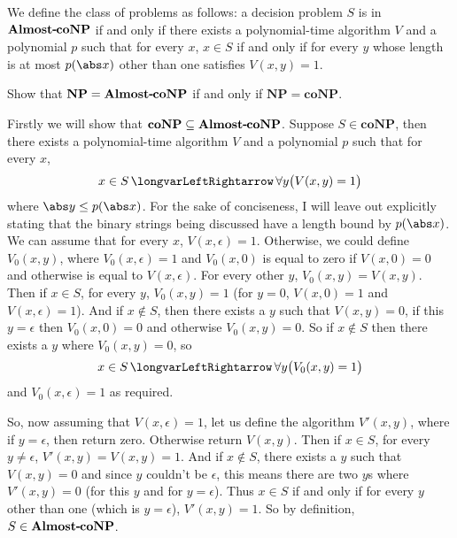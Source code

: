 \documentclass[10pt]{article}
\def\iff{\,\longvarLeftRightarrow\,}
\def\NP{\mathbf{NP}}
\def\coNP{\mathbf{coNP}}
\begin{document}


\bigskip

\def\acoNP{\mathbf{Almost\vcenter{\hrule width3pt height1pt}coNP}}
\begin{exercise*}

    We define the class of \ppemph{almost $\coNP$} problems as follows: a decision problem $S$ is in $\acoNP$ if and only if there exists a polynomial-time algorithm $V$ and a polynomial $p$ such that
    for every $x$, $x\in S$ if and only if for every $y$ whose length is at most $p(\abs x)$ other than one satisfies $V(x,y)=1$.

    Show that $\NP=\acoNP$ if and only if $\NP=\coNP$.

\end{exercise*}

Firstly we will show that $\coNP\subseteq\acoNP$.
Suppose $S\in\coNP$, then there exists a polynomial-time algorithm $V$ and a polynomial $p$ such that for every $x$,
\[ x\in S \iff \forall y\bigl(V(x,y)=1\bigr) \]
where $\abs y\leq p(\abs x)$.
For the sake of conciseness, I will leave out explicitly stating that the binary strings being discussed have a length bound by $p(\abs x)$.
We can assume that for every $x$, $V(x,\epsilon)=1$.
Otherwise, we could define $V_0(x,y)$, where $V_0(x,\epsilon)=1$ and $V_0(x,0)$ is equal to zero if $V(x,0)=0$ and otherwise is equal to $V(x,\epsilon)$.
For every other $y$, $V_0(x,y)=V(x,y)$.
Then if $x\in S$, for every $y$, $V_0(x,y)=1$ (for $y=0$, $V(x,0)=1$ and $V(x,\epsilon)=1$).
And if $x\notin S$, then there exists a $y$ such that $V(x,y)=0$, if this $y=\epsilon$ then $V_0(x,0)=0$ and otherwise $V_0(x,y)=0$.
So if $x\notin S$ then there exists a $y$ where $V_0(x,y)=0$, so
\[ x\in S \iff \forall y\bigl(V_0(x,y)=1\bigr) \]
and $V_0(x,\epsilon)=1$ as required.

So, now assuming that $V(x,\epsilon)=1$, let us define the algorithm $V'(x,y)$, where if $y=\epsilon$, then return zero.
Otherwise return $V(x,y)$.
Then if $x\in S$, for every $y\neq\epsilon$, $V'(x,y)=V(x,y)=1$.
And if $x\notin S$, there exists a $y$ such that $V(x,y)=0$ and since $y$ couldn't be $\epsilon$, this means there are two $y$s where $V'(x,y)=0$ (for this $y$ and for $y=\epsilon$).
Thus $x\in S$ if and only if for every $y$ other than one (which is $y=\epsilon$), $V'(x,y)=1$.
So by definition, $S\in\acoNP$.
\end{document}
